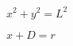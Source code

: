 \documentclass{article}
\begin{document}
$ x^2 +y^2 = L^2 $
\pagebreak

$ x+D = r $
\pagebreak
\end{document}
